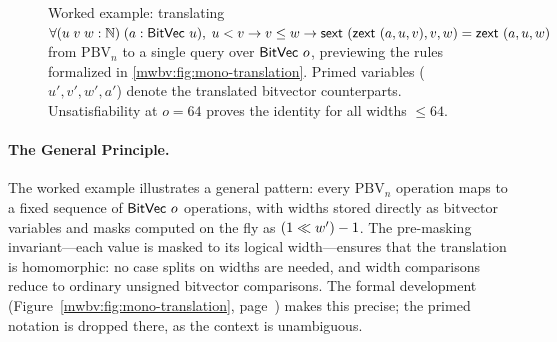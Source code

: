 \begin{figure}[htbp]
\footnotesize
{}
\caption{Worked example: translating
$\forall (u\;v\;w : \mathbb N)\;(a : \mathsf{BitVec}~{u}),\;
u < v \to v \leq w \to \mathsf{sext}~(\mathsf{zext}~(a, u, v), v, w) = \mathsf{zext}~(a, u, w)$
from $\text{PBV}_n$ to a single \qfbv{} query over $\mathsf{BitVec}~{o}$,
previewing the rules formalized in \cref{mwbv:fig:mono-translation}.
Primed variables ($u', v', w', a'$) denote the translated bitvector counterparts.
Unsatisfiability at $o = 64$ proves the identity for all widths $\leq 64$.}
\label{mwbv:fig:worked-example}
\end{figure}

\paragraph{The General Principle.}
%
The worked example illustrates a general pattern: every $\text{PBV}_n$
operation maps to a fixed sequence of $\mathsf{BitVec}~{o}$ operations, with widths stored
directly as bitvector variables and masks computed on the fly as
$(1 \ll w') - 1$.
The pre-masking invariant—each value is masked to its logical width—ensures that
the translation is homomorphic: no case splits on widths are needed, and width
comparisons reduce to ordinary unsigned bitvector comparisons. The formal
development (Figure~\ref{mwbv:fig:mono-translation},
page~\pageref{mwbv:fig:mono-translation}) makes this precise; the primed notation is
dropped there, as the context is unambiguous.

